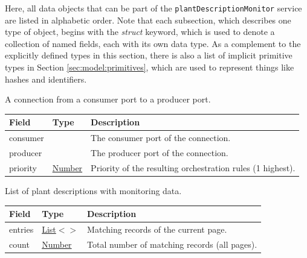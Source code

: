 \documentclass[a4paper]{arrowhead}
\newcommand{\mref}[2][]{{\textcolor{ArrowheadPurple}{\hyperref[sec:model:#2]{\ifstrempty{#1}{#2}{#1}}}}}
\newcommand{\pref}[1]{{\textcolor{ArrowheadGrey}{\hyperref[sec:model:primitives:#1]{#1}}}}
\begin{document}
Here, all data objects that can be part of the \texttt{plant\allowbreak{}Description\allowbreak{}Monitor} service are listed in alphabetic order.
Note that each subsection, which describes one type of object, begins with the \textit{struct} keyword, which is used to denote a collection of named fields, each with its own data type.
As a complement to the explicitly defined types in this section, there is also a list of implicit primitive types in Section \ref{sec:model:primitives}, which are used to represent things like hashes and identifiers.


A connection from a consumer port to a producer port.


\noindent\begin{tabularx}{\textwidth}{| >{\raggedright\arraybackslash}p{3.9cm} | >{\raggedright\arraybackslash\small}p{5.3cm} | X |} \hline
\rowcolor{gray!33} Field & Type & Description \\ \hline
consumer & \mref{SystemPort} & The consumer port of the connection. \\ \hline
producer & \mref{SystemPort} & The producer port of the connection. \\ \hline
priority & \pref{Number} & Priority of the resulting orchestration rules (1 highest). \\ \hline
\end{tabularx}




List of plant descriptions with monitoring data.


\noindent\begin{tabularx}{\textwidth}{| >{\raggedright\arraybackslash}p{3.9cm} | >{\raggedright\arraybackslash\small}p{5.3cm} | X |} \hline
\rowcolor{gray!33} Field & Type & Description \\ \hline
entries & \pref{List}$<$\allowbreak{}\mref[Monitor\allowbreak{}Plant\allowbreak{}Description\allowbreak{}Response]{MonitorPlantDescriptionResponse}$>$ & Matching records of the current page. \\ \hline
count & \pref{Number} & Total number of matching records (all pages). \\ \hline
\end{tabularx}



\end{document}
